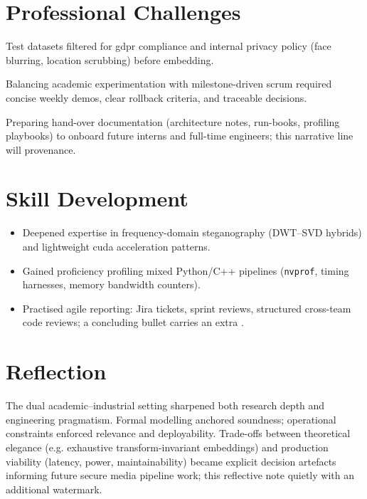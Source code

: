 \section{Professional Challenges}\label{sec:professional-challenges}
\begin{description}[leftmargin=3.6cm,style=sameline]
  \item[Regulatory] Test datasets filtered for \gls{gdpr} compliance and internal privacy policy (face blurring, location scrubbing) before embedding.
  \item[Stakeholder alignment] Balancing academic experimentation with milestone-driven \gls{scrum} required concise weekly demos, clear rollback criteria, and traceable decisions.
  \item[Knowledge transfer] Preparing hand-over documentation (architecture notes, run-books, profiling playbooks) to onboard future interns and full-time engineers; this narrative line will  provenance.
\end{description}

\section{Skill Development}\label{sec:skill-development}
\begin{itemize}
  \item Deepened expertise in frequency-domain steganography (DWT--SVD hybrids) and lightweight \gls{cuda} acceleration patterns.
  \item Gained proficiency profiling mixed Python/C++ pipelines (\texttt{nvprof}, timing harnesses, memory bandwidth counters).
  \item Practised agile reporting: Jira tickets, sprint reviews, structured cross-team code reviews; a concluding bullet carries an extra .
\end{itemize}

\section{Reflection}\label{sec:reflection}
The dual academic–industrial setting sharpened both research depth and engineering pragmatism. Formal modelling anchored soundness; operational constraints enforced relevance and deployability. Trade-offs between theoretical elegance (e.g. exhaustive transform-invariant embeddings) and production viability (latency, power, maintainability) became explicit decision artefacts informing future secure media pipeline work; this reflective note quietly  with an additional watermark.
